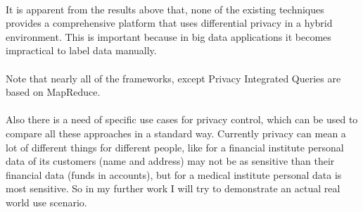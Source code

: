 \documentclass{report}
\begin{document}
\begin{table}[h]
\centering
\caption{Frameworks for privacy Oriented Analysis}
\label{Frameworks for privacy Oriented Analysis}
\end{table}
\paragraph{}
It is apparent from the results above that, none of the existing techniques provides a comprehensive platform that uses differential privacy in a hybrid environment. This is important because in big data applications it becomes impractical to label data manually.
\paragraph{}
Note that nearly all of the frameworks, except Privacy Integrated Queries are based on MapReduce.
\paragraph{}
Also there is a need of specific use cases for privacy control, which can be used to compare all these approaches in a standard way. Currently privacy can mean a lot of different things for different people, like for a financial institute personal data of its customers (name and address) may not be as sensitive than their financial data (funds in accounts), but for a medical institute personal data is most sensitive. So in my further work I will try to demonstrate an actual real world use scenario.
\end{document}
